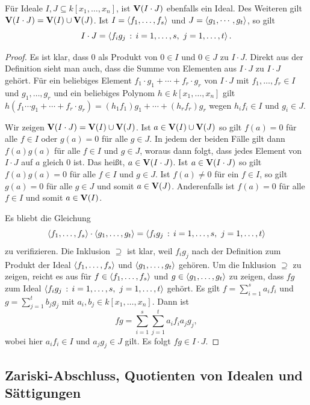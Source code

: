 \documentclass[11pt]{article}
\numberwithin{equation}{section}
\begin{document}
\begin{proposition} 
		Für Ideale $I, J \subseteq k[x_1,\ldots,x_n]$, ist $\mathbf{V}(I \cdot J)$ ebenfalls ein Ideal. Des Weiteren gilt $\mathbf{V}(I \cdot J) = \mathbf{V}(I) \cup \mathbf{V}(J)$.  Ist $I= \left< f_1,\ldots,f_s \right>$ und $J= \left< g_1,\cdots,g_t \right>$, so gilt 
		\[
			I \cdot J = \left< f_i g_j \,:\, i=1,\ldots,s, \ j=1,\ldots,t  \right>. 
		\]
\end{proposition} 
\begin{proof} 
	Es ist klar, dass $0$ als Produkt von $0 \in I$ und $0 \in J$ zu $I \cdot J$. Direkt aus der Definition sieht man auch, dass die Summe von Elementen aus $I \cdot J$ zu $I \cdot J$ gehört. Für ein beliebiges Element $f_1 \cdot g_1 + \cdots + f_r \cdot g_r$ von $I \cdot J$ mit $f_1,\ldots,f_r \in I$ und $g_1,\ldots,g_r$ und ein beliebiges Polynom $h \in k[x_1,\ldots,x_n]$ gilt $h (f_1 \cdots g_1 + \cdots + f_r \cdot g_r) = (h_1 f_1)  g_1 + \cdots + (h_r f_r) g_r$ wegen $h_i f_i \in I$ und $g_i \in J$. 
	
	Wir zeigen $\mathbf{V}(I \cdot J) = \mathbf{V}(I) \cup \mathbf{V}(J)$. Ist $a \in \mathbf{V}(I) \cup \mathbf{V}(J)$ so gilt $f(a)=0$ für alle $f \in  I$ oder $g(a) = 0$ für alle $g \in J$. In jedem der beiden Fälle gilt dann $f (a) g(a)$ für alle $f \in I$ und $g \in J$, woraus dann folgt, dass jedes Element von $I \cdot J$ auf $a$ gleich $0$ ist. Das heißt, $a \in \mathbf{V}(I \cdot J)$. Ist $a \in \mathbf{V}(I \cdot J)$ so gilt $f(a) g(a) =0$ für alle $f \in I$ und $g \in J$. Ist $f(a) \ne 0$ für ein $f \in I$, so gilt $g(a) =0$ für alle $g \in J$ und somit $a \in \mathbf{V}(J)$. Anderenfalls ist $f(a) =0$ für alle $f \in I$ und somit $a \in \mathbf{V}(I)$. 
	
	Es bliebt die Gleichung 
	\[
		\ideal{f_1,\ldots, f_s} \cdot \ideal{g_1,\ldots,g_t} = \ideal{ f_i g_j \,:\, i=1,\ldots,s, \ j=1,\ldots,t}
	\]
	zu verifizieren. Die Inklusion $\supseteq$ ist klar, weil $f_i g_j$ nach der Definition zum Produkt der Ideal $\left< f_1,\ldots,f_s \right>$ und $\left< g_1,\ldots,g_t \right>$ gehören. Um die Inklusion $\supseteq$ zu zeigen, reicht es aus für $f \in \left< f_1,\ldots,f_s \right>$ und $ g \in \left< g_1,\ldots,g_t \right>$ zu zeigen, dass $f g$ zum Ideal $\left<  f_i g_j \,:\, i=1,\ldots,s, \ j=1,\ldots,t \right>$  gehört. Es gilt 
	$f = \sum_{i=1}^s a_i f_i$  und $g = \sum_{j=1}^t b_j g_j$ mit $a_i,b_j \in k[x_1,\ldots,x_n]$. Dann ist 
	\[
		f g = \sum_{i=1}^s \sum_{j=1}^t a_i f_i a_j g_j, 
	\]
	wobei hier $a_i f_i \in I$ und $a_j g_j \in J$ gilt. Es folgt $f g \in I \cdot J$. 
\end{proof} 

\subsection{Zariski-Abschluss, Quotienten von Idealen und Sättigungen} 
\end{document}
